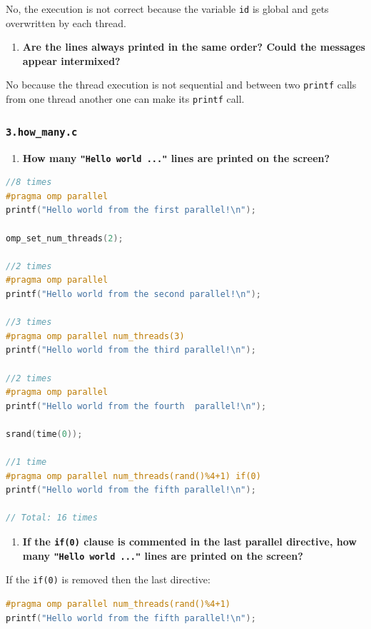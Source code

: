 \documentclass[a4paper]{article}
\begin{document}
No, the execution is not correct because the variable \verb|id| is global and gets overwritten by each thread.

\begin{enumerate}[resume]
	\item \textbf{Are the lines always printed in the same order? Could the messages appear intermixed?}
\end{enumerate}

No because the thread execution is not sequential and between two \verb|printf| calls from one thread another one can make its \verb|printf| call.

\subsubsection{\texttt{3.how\_many.c}}

\begin{enumerate}
	\item \textbf{How many \texttt{"Hello world ..."} lines are printed on the screen?}
\end{enumerate}

\begin{lstlisting}[language=C]
//8 times
#pragma omp parallel
printf("Hello world from the first parallel!\n");

omp_set_num_threads(2);

//2 times
#pragma omp parallel
printf("Hello world from the second parallel!\n");

//3 times
#pragma omp parallel num_threads(3)
printf("Hello world from the third parallel!\n");

//2 times
#pragma omp parallel
printf("Hello world from the fourth  parallel!\n");

srand(time(0));

//1 time
#pragma omp parallel num_threads(rand()%4+1) if(0) 
printf("Hello world from the fifth parallel!\n");

// Total: 16 times
\end{lstlisting}

\begin{enumerate}[resume]
	\item \textbf{If the \texttt{if(0)} clause is commented in the last parallel directive, how many \texttt{"Hello world ..."} lines are printed on the screen?}
\end{enumerate}

If the \verb|if(0)| is removed then the last directive:
\begin{lstlisting}[language=C]
#pragma omp parallel num_threads(rand()%4+1) 
printf("Hello world from the fifth parallel!\n");
\end{lstlisting}
\end{document}
